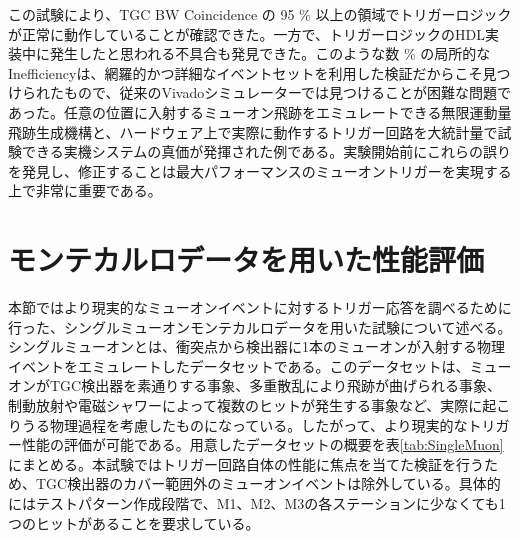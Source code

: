 この試験により、TGC BW Coincidence の 95 \% 以上の領域でトリガーロジックが正常に動作していることが確認できた。一方で、トリガーロジックのHDL実装中に発生したと思われる不具合も発見できた。このような数 \% の局所的なInefficiencyは、網羅的かつ詳細なイベントセットを利用した検証だからこそ見つけられたもので、従来のVivadoシミュレーターでは見つけることが困難な問題であった。任意の位置に入射するミューオン飛跡をエミュレートできる無限運動量飛跡生成機構と、ハードウェア上で実際に動作するトリガー回路を大統計量で試験できる実機システムの真価が発揮された例である。実験開始前にこれらの誤りを発見し、修正することは最大パフォーマンスのミューオントリガーを実現する上で非常に重要である。


\section{モンテカルロデータを用いた性能評価}
\label{sec_SingleMuon}

本節ではより現実的なミューオンイベントに対するトリガー応答を調べるために行った、シングルミューオンモンテカルロデータを用いた試験について述べる。シングルミューオンとは、衝突点から検出器に1本のミューオンが入射する物理イベントをエミュレートしたデータセットである。このデータセットは、ミューオンがTGC検出器を素通りする事象、多重散乱により飛跡が曲げられる事象、制動放射や電磁シャワーによって複数のヒットが発生する事象など、実際に起こりうる物理過程を考慮したものになっている。したがって、より現実的なトリガー性能の評価が可能である。用意したデータセットの概要を表\ref{tab:SingleMuon}にまとめる。本試験ではトリガー回路自体の性能に焦点を当てた検証を行うため、TGC検出器のカバー範囲外のミューオンイベントは除外している。具体的にはテストパターン作成段階で、M1、M2、M3の各ステーションに少なくても1つのヒットがあることを要求している。

